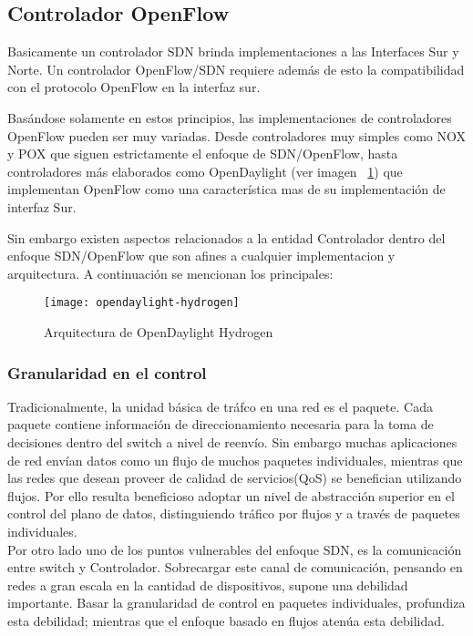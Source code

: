 \subsection{Controlador OpenFlow}
Basicamente un controlador SDN brinda implementaciones a las Interfaces Sur y Norte. Un controlador OpenFlow/SDN requiere adem\'as de esto la compatibilidad con el protocolo OpenFlow en la interfaz sur. 

Basándose solamente en estos principios, las implementaciones de controladores OpenFlow pueden ser muy variadas. Desde controladores muy simples como NOX\cite{ControllersNOX} y POX\cite{ControllersPOX} que siguen estrictamente el enfoque de SDN/OpenFlow, hasta controladores m\'as elaborados como OpenDaylight\cite{ControllersOpendaylight} (ver imagen ~\ref{fig:OpenDayLightHydrogen}) que implementan OpenFlow como una característica mas de su implementaci\'on de interfaz Sur.

Sin embargo existen aspectos relacionados a la entidad Controlador dentro del enfoque SDN/OpenFlow que son afines a cualquier implementacion y arquitectura. A continuaci\'on se mencionan los principales:
  
\begin{figure}[ht!] 
\centering    
\texttt{[image: opendaylight-hydrogen]}
\caption[OF 1.3.3 Matching Fields]{Arquitectura de OpenDaylight Hydrogen}
\label{fig:OpenDayLightHydrogen}
\end{figure}

\subsubsection{Granularidad en el control}
Tradicionalmente, la unidad básica de tráfco en una red es el paquete. Cada paquete contiene información de direccionamiento necesaria para la toma de decisiones dentro del switch a nivel de reenvío. Sin embargo muchas aplicaciones de red envían datos como un flujo de muchos paquetes individuales, mientras que las redes que desean proveer de calidad de servicios(QoS) se benefician utilizando flujos. Por ello resulta beneficioso adoptar un nivel de abstracción superior en el control del plano de datos, distinguiendo tr\'afico por flujos y a través de paquetes individuales.\\
 
Por otro lado uno de los puntos vulnerables del enfoque SDN, es la comunicación entre switch y Controlador. Sobrecargar este canal de comunicación, pensando en redes a gran escala en la cantidad de dispositivos, supone una debilidad importante. Basar la granularidad de control en paquetes individuales, profundiza esta debilidad; mientras que el enfoque basado en flujos atenúa esta debilidad. 


